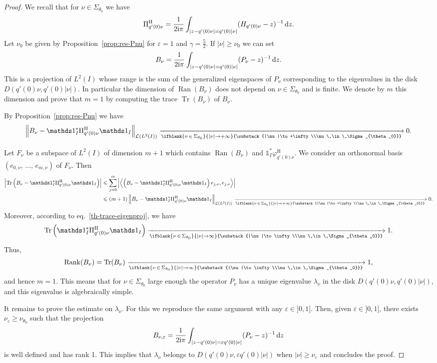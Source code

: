 \documentclass[10pt]{amsart}
\theoremstyle{definition}\newtheorem{defi}[theo]{Definition}\newtheorem{rema}[theo]{Remark}\newtheorem{exam}[theo]{Example}\newtheorem{exem}[theo]{Example}\newtheorem{nota}[theo]{Notation}
\newcommand{\abs}[1]{\left\vert #1\right\vert}
\newcommand{\nr}[1]{\left\Vert #1\right\Vert}
\newcommand{\innp}[2]{\left \langle #1, #2 \right \rangle}
\renewcommand{\leq}{\leqslant}
\renewcommand{\geq}{\geqslant}
\newcommand{\inv}{^{-1}}
\newcommand{\1}{\mathds 1}
\newcommand{\limt}[3][]{\xrightarrow[\ifblank{#1}{#2 \to #3}{\substack{#2\to #3\\#1}}]{}}
\DeclareMathOperator{\Rank}{Rank}
\DeclareMathOperator{\Ran}{Ran}
\DeclareMathOperator{\Tr}{Tr}
\newcommand{\Lc}{{\mathcal L}}
\newcommand{\diff}[1][-3]{\ensuremath{\mathop{}\mkern#1mu\mathrm{d}}}
\newcommand{\iu}{\mathrm i}
\newcommand{\sector}[1][\theta_0]{\Sigma_{#1}}
\newcommand{\h}{{\mathrm{H}}}
\newcommand{\g}{\gamma}
\newcommand{\e}{\varepsilon}
\renewcommand{\l}{\lambda}
\newcommand{\f}{\varphi}
\begin{document}
\begin{proof}
We recall that for $\nu \in \sector$ we have
\[
\Pi^\h_{q'(0) \nu} = \frac 1 {2\iu\pi} \int_{\abs{z - q'(0) \nu} = q'(0)|\nu|} (H_{q'(0)\nu}-z)\inv \diff z.
\]
Let $\nu_0$ be given by Proposition~\ref{prop:res-Pnu} for $\e = 1$ and $\g = \frac 52$. If $\abs \nu \geq \nu_0$ we can set
\[
B_\nu = \frac 1 {2\iu\pi} \int_{\abs{z - q'(0) \nu} = q'(0)|\nu|} (P_\nu-z)\inv \diff z.
\]
This is a projection of $L^2(I)$ whose range is the sum of the generalized eigenspaces of $P_\nu$ corresponding to the eigenvalues in the disk $D(q'(0) \nu, q'(0)\abs \nu)$. In particular the dimension of $\Ran(B_\nu)$ does not depend on $\nu \in \Sigma_{\theta_0}$ and is finite. We denote by $m$ this dimension and prove that $m=1$ by computing the trace $\Tr(B_\nu)$ of $B_\nu$.

By Proposition~\ref{prop:res-Pnu} we have
\[
\left\| B_\nu - \1_I^* \Pi^\h_{q'(0) \nu} \1_I \right\|_{\Lc\left(L^2(I)\right)} \limt[\nu\,\in\,\sector]{|\nu|}{+\infty} 0.
\]

Let $F_\nu$ be a subspace of $L^2(I)$ of dimension $m+1$ which contains $\Ran(B_\nu)$ and $\1_I^* \f_{q'(0)\nu}^\h$. We consider an orthonormal basis $(e_{0,\nu},\,\dots,\,e_{m,\nu})$ of $F_\nu$. Then
\begin{align*}
\abs{\Tr\left(B_\nu - \1_I^* \Pi^\h_{q'(0) \nu} \1_I \right)} &\leq \sum_{j=0}^m \abs{\innp{\left(B_\nu - \1_I^* \Pi^\h_{q'(0) \nu} \1_I \right)e_{j,\nu}}{e_{j,\nu}}}\\
&\leq (m+1) \nr{B_\nu - \1_I^* \Pi^\h_{q'(0) \nu} \1_I}_{\Lc(L^2(I))}
\limt[\nu\,\in\,\sector]{|\nu|}{+\infty} 0.
\end{align*}
Moreover, according to eq.~\eqref{th-trace-eigenproj}, we have
\begin{equation*}
\Tr\left(\1_I^* \Pi^\h_{q'(0) \nu} \1_I\right) \limt[\nu\,\in\,\sector]{|\nu|}{\infty} 1.
\end{equation*}
Thus,
\[
\Rank(B_\nu) = \Tr(B_\nu) \limt[\nu\,\in\,\sector]{|\nu|}{\infty} 1,
\]
and hence $m = 1$. This means that for $\nu \in \Sigma_{\theta_0}$ large enough the operator $P_\nu$ has a unique eigenvalue $\l_\nu$ in the disk $D(q'(0)\nu,q'(0)\abs \nu)$, and this eigenvalue is algebraically simple.

It remains to prove the estimate on $\l_\nu$. For this we reproduce the same argument with any $\e \in]0,1]$. Then, given $\e \in]0,1]$, there exists $\nu_\e \geq \nu_{\theta_0}$ such that the projection
\[
B_{\nu,\e} = \frac 1 {2\iu \pi} \int_{\abs{z - q'(0) \nu} = \e q'(0) |\nu|} (P_\nu-z)\inv \diff z
\]
is well defined and has rank 1. This implies that $\l_\nu$ belongs to $D(q'(0)\nu, \e q'(0) \abs\nu)$ when $\abs \nu \geq \nu_\e$ and concludes the proof.
\end{proof}
\end{document}
